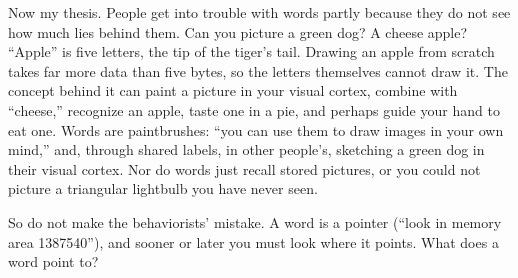 Now my thesis. People get into trouble with words partly because they do not see how much lies behind them. Can you picture a green dog? A cheese apple? ``Apple'' is five letters, the tip of the tiger's tail. Drawing an apple from scratch takes far more data than five bytes, so the letters themselves cannot draw it. The concept behind it can paint a picture in your visual cortex, combine with ``cheese,'' recognize an apple, taste one in a pie, and perhaps guide your hand to eat one. Words are paintbrushes: ``you can use them to draw images in your own mind,'' and, through shared labels, in other people's, sketching a green dog in their visual cortex. Nor do words just recall stored pictures, or you could not picture a triangular lightbulb you have never seen.

So do not make the behaviorists' mistake. A word is a pointer (``look in memory area 1387540''), and sooner or later you must look where it points. What does a word point to?
